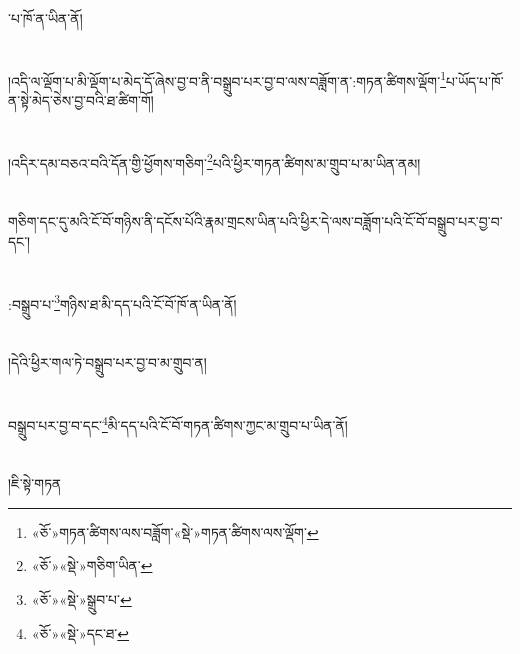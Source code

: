 ་པ་ཁོ་ན་ཡིན་ནོ།\chapter{ }།འདི་ལ་ལྡོག་པ་མི་ལྡོག་པ་མེད་དོ་ཞེས་བྱ་བ་ནི་བསྒྲུབ་པར་བྱ་བ་ལས་བཟློག་ན་:གཏན་ཚིགས་ལྡོག་\footnote{«ཅོ་»གཏན་ཚིགས་ལས་བཟློག་«སྡེ་»གཏན་ཚིགས་ལས་ལྡོག་}པ་ཡོད་པ་ཁོ་ན་སྟེ་མེད་ཅེས་བྱ་བའི་ཐ་ཚིག་གོ།\chapter{ }།འདིར་དམ་བཅའ་བའི་དོན་གྱི་ཕྱོགས་གཅིག་\footnote{«ཅོ་»«སྡེ་»གཅིག་ཡིན་}པའི་ཕྱིར་གཏན་ཚིགས་མ་གྲུབ་པ་མ་ཡིན་ནམ།\chapter{ }གཅིག་དང་དུ་མའི་ངོ་བོ་གཉིས་ནི་དངོས་པོའི་རྣམ་གྲངས་ཡིན་པའི་ཕྱིར་དེ་ལས་བཟློག་པའི་ངོ་བོ་བསྒྲུབ་པར་བྱ་བ་དང་།\chapter{ }:བསྒྲུབ་པ་\footnote{«ཅོ་»«སྡེ་»སྒྲུབ་པ་}གཉིས་ཐ་མི་དད་པའི་ངོ་བོ་ཁོ་ན་ཡིན་ནོ།\chapter{ }།དེའི་ཕྱིར་གལ་ཏེ་བསྒྲུབ་པར་བྱ་བ་མ་གྲུབ་ན།\chapter{ }བསྒྲུབ་པར་བྱ་བ་དང་\footnote{«ཅོ་»«སྡེ་»དང་ཐ་}མི་དད་པའི་ངོ་བོ་གཏན་ཚིགས་ཀྱང་མ་གྲུབ་པ་ཡིན་ནོ།\chapter{ }།ཇི་སྟེ་གཏན